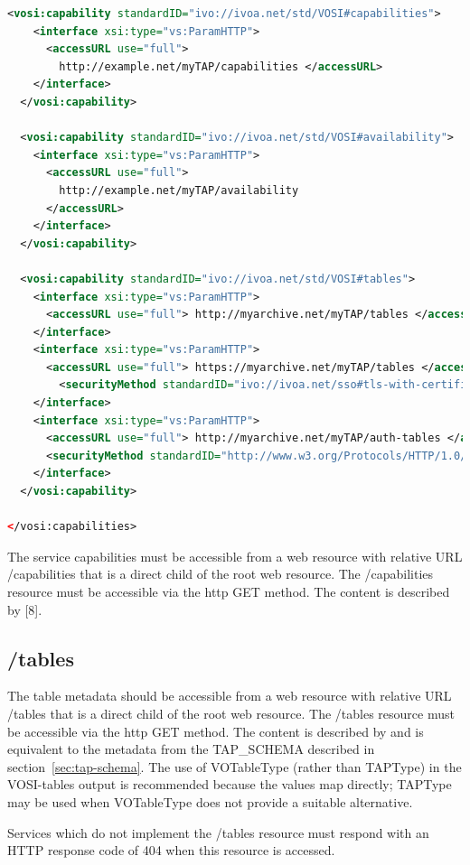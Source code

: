 \documentclass[11pt,letter]{ivoa}
\begin{document}
\begin{lstlisting}[language=XML]
  <vosi:capability standardID="ivo://ivoa.net/std/VOSI#capabilities">
    <interface xsi:type="vs:ParamHTTP">
      <accessURL use="full">
        http://example.net/myTAP/capabilities </accessURL>
    </interface>
  </vosi:capability>

  <vosi:capability standardID="ivo://ivoa.net/std/VOSI#availability">
    <interface xsi:type="vs:ParamHTTP">
      <accessURL use="full">
        http://example.net/myTAP/availability
      </accessURL>
    </interface>
  </vosi:capability>

  <vosi:capability standardID="ivo://ivoa.net/std/VOSI#tables">
    <interface xsi:type="vs:ParamHTTP">
      <accessURL use="full"> http://myarchive.net/myTAP/tables </accessURL>
    </interface>
    <interface xsi:type="vs:ParamHTTP">
      <accessURL use="full"> https://myarchive.net/myTAP/tables </accessURL>
        <securityMethod standardID="ivo://ivoa.net/sso#tls-with-certificate" />
    </interface>
    <interface xsi:type="vs:ParamHTTP">
      <accessURL use="full"> http://myarchive.net/myTAP/auth-tables </accessURL>
      <securityMethod standardID="http://www.w3.org/Protocols/HTTP/1.0/spec.html#BasicAA" />
    </interface>
  </vosi:capability>

</vosi:capabilities>
\end{lstlisting}

The service capabilities must be accessible from a web resource with relative 
URL /capabilities that is a direct child of the root web resource. The 
/capabilities resource must be accessible via the http GET method. The content 
is described by [8].

\subsection{/tables}
\label{sec:vosi-tables}

The table metadata should be accessible from a web resource with relative URL 
/tables that is a direct child of the root web resource. The /tables resource 
must be accessible via the http GET method. The content is described by 
\citep{std:VODS11} and is equivalent to the metadata from the 
TAP\_SCHEMA described in section~\ref{sec:tap-schema}. The use of VOTableType 
(rather than TAPType) in the VOSI-tables output  is recommended because the values 
map directly; TAPType may be used when VOTableType does not provide a suitable
alternative.

Services which do not implement the /tables resource must respond with an HTTP 
response code of 404 when this resource is accessed.
\end{document}
